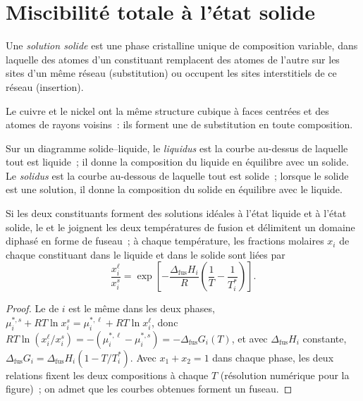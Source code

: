 \section{Miscibilité totale à l'état solide}

\begin{definition}\label{def:b2:solid-liquid-diagrams:solid-solution}
Une \emph{solution solide} est une phase cristalline unique de
composition variable, dans laquelle des atomes d'un constituant remplacent des atomes de
l'autre sur les sites d'un même réseau (substitution) ou occupent les sites interstitiels de
ce réseau (insertion).
\end{definition}

Le cuivre et le nickel ont la même structure cubique à faces centrées et des atomes de
rayons voisins~: ils forment une  de substitution en toute composition.

\begin{definition}\label{def:b2:solid-liquid-diagrams:liquidus}
Sur un diagramme solide--liquide, le \emph{liquidus} est la courbe
au-dessus de laquelle tout est liquide~; il donne la composition du liquide en
équilibre avec un solide. Le \emph{solidus} est la courbe au-dessous
de laquelle tout est solide~; lorsque le solide est une solution, il donne la
composition du solide en équilibre avec le liquide.
\end{definition}

\begin{proposition}[Le fuseau]\label{prop:b2:solid-liquid-diagrams:lens}
Si les deux constituants forment des solutions idéales à l'état liquide et à l'état solide,
le  et le  joignent les deux températures de fusion et délimitent un
domaine diphasé en forme de fuseau~; à chaque température, les fractions molaires $x_i$ de
chaque constituant dans le liquide et dans le solide sont liées par
\[
  \frac{x_i^{\ell}}{x_i^{s}} = \exp\left[-\frac{\Delta_{\text{fus}}H_i}{R}\left(\frac1T - \frac1{T_i^*}\right)\right] .
\]
\end{proposition}

\begin{proof}
Le  de $i$ est le même dans les deux phases, $\mu_i^{*,s} +
RT\ln x_i^s = \mu_i^{*,\ell} + RT\ln x_i^\ell$, donc $RT\ln(x_i^\ell/x_i^s) =
-(\mu_i^{*,\ell} - \mu_i^{*,s}) = -\Delta_{\text{fus}}G_i(T)$, et avec
$\Delta_{\text{fus}}H_i$ constante, $\Delta_{\text{fus}}G_i = \Delta_{\text{fus}}H_i(1 - T/T_i^*)$.
Avec $x_1 + x_2 = 1$ dans chaque phase, les deux relations fixent les deux
compositions à chaque $T$ (résolution numérique pour la figure)~; on admet que
les courbes obtenues forment un fuseau.
\end{proof}


